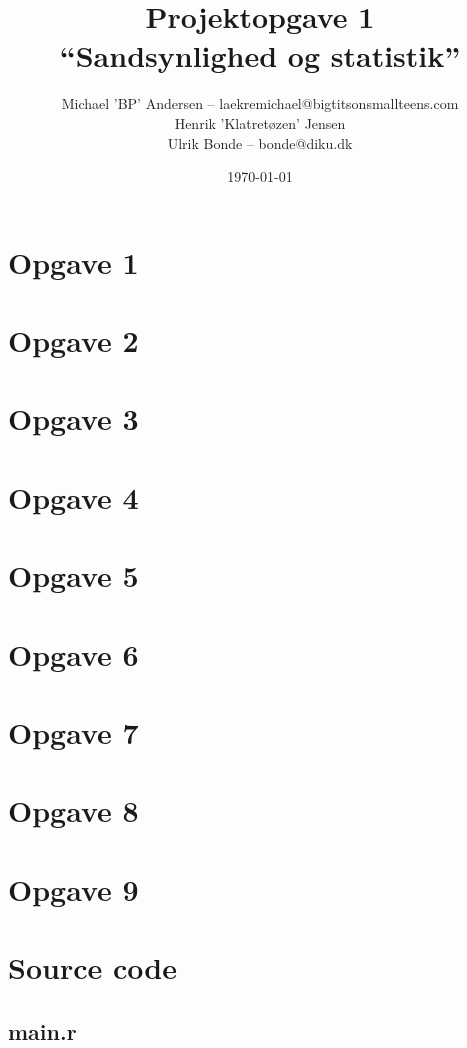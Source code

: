\documentclass[a4paper, 10pt, final]{article}
\title{Projektopgave 1\\ ``Sandsynlighed og statistik''}
\author{Michael 'BP' Andersen -- laekremichael@bigtitsonsmallteens.com\\ Henrik 'Klatretøzen' Jensen \\ Ulrik Bonde -- bonde@diku.dk}
\date{\today}
\begin{document}
\maketitle
\thispagestyle{empty}

\section*{Opgave 1}


\section*{Opgave 2}


\section*{Opgave 3}


\section*{Opgave 4}

\section*{Opgave 5}


\section*{Opgave 6}

\section*{Opgave 7}

\section*{Opgave 8}

\section*{Opgave 9}
\newpage

\appendix

\section{Source code}
\subsection{main.r \label{app_source1}}

\end{document}
